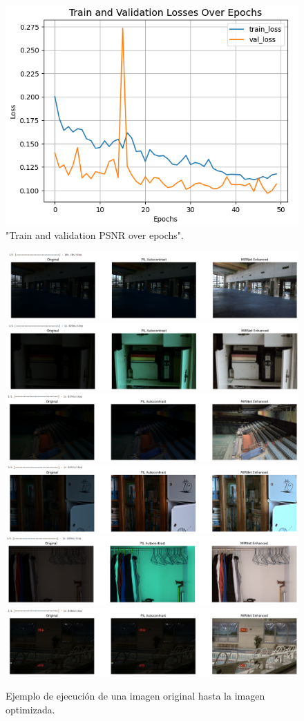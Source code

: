 \documentclass[a4paper,
               ]{jacow}
\begin{document}
\begin{figure}[!h]
    \centering
    \includegraphics*[width=.5\textwidth]{ll-train-losses-ep}
    \caption{"Train and validation PSNR over epochs".}
    \label{fig:ll_train_losses_ep}
\end{figure}

\begin{figure}[!h]
    \centering
    \includegraphics*[width=.5\textwidth]{ll-1}
    \includegraphics*[width=.5\textwidth]{ll-2}
    \includegraphics*[width=.5\textwidth]{ll-3}
    \includegraphics*[width=.5\textwidth]{ll-4}
    \includegraphics*[width=.5\textwidth]{ll-5}
    \includegraphics*[width=.5\textwidth]{ll-6}
    \caption{Ejemplo de ejecución de una imagen original hasta la imagen optimizada.}
    \label{fig:ejem_procesamiento}
\end{figure}
\end{document}
